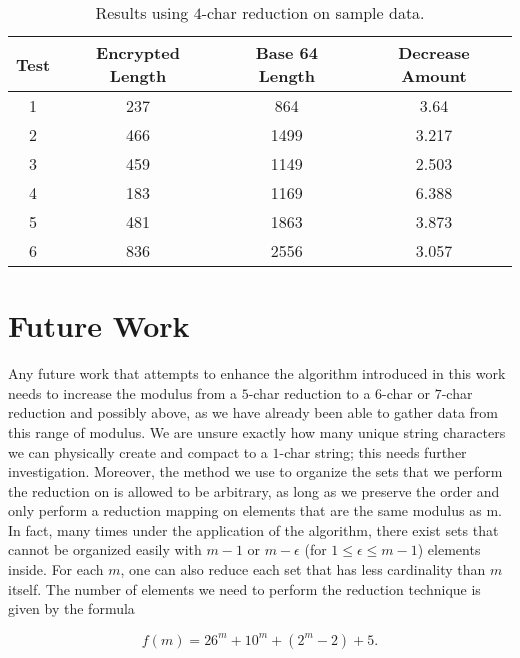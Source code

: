 \documentclass[amsmath,12pt,a4paper]{amsart}
\begin{document}
\begin{table}[h!]
\centering
\caption{Results using $4$-char reduction on sample data.}
\begin{tabular}{@{}cccc@{}}
\toprule
\textbf{Test} & \textbf{Encrypted Length} & \textbf{Base 64 Length} & \textbf{Decrease Amount} \\ \midrule
1             & 237                    & 864                      & 3.64                     \\
2             & 466                   & 1499                       & 3.217                    \\
3             & 459                   & 1149                       & 2.503                    \\
4             & 183                   & 1169                       & 6.388                    \\
5             & 481                   & 1863                       & 3.873                    \\
6             & 836                    & 2556                       & 3.057                    \\ \bottomrule
\end{tabular}
\end{table}

 \section{Future Work}
 
 Any future work that attempts to enhance the algorithm introduced in this work needs to increase the modulus from a $5$-char reduction to a $6$-char or $7$-char reduction and possibly above, as we have already been able to gather data from this range of modulus. We are unsure exactly how many unique string characters we can physically create and compact to a $1$-char string; this needs further investigation. Moreover, the method we use to organize the sets that we perform the reduction on is allowed to be arbitrary, as long as we preserve the order and only perform a reduction mapping on elements that are the same modulus as m. In fact, many times under the application of the algorithm, there exist sets that cannot be organized easily with $m-1$ or $m-\epsilon$ (for $1\le \epsilon \le m-1$)  elements inside. For each $m$, one can also reduce each set that has less cardinality than $m$ itself. The number of elements we need to perform the reduction technique is given by the formula
 
 \begin{equation}\label{Eq55} 
 f(m) = 26^m+ 10^m + (2^m-2) + 5.
 \end{equation}
\end{document}
